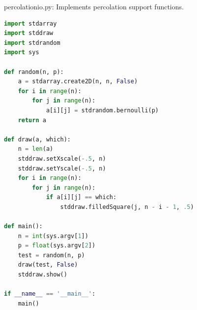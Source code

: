 \documentclass[8pt,a4paper,compress]{beamer}
\begin{document}
\begin{frame}[fragile]
\pause

\begin{framed}
\tiny percolationio.py: Implements percolation support functions.
\end{framed}

\begin{lstlisting}[language=Python,style=focusin]
import stdarray
import stddraw
import stdrandom
import sys

def random(n, p):
    a = stdarray.create2D(n, n, False)
    for i in range(n):
        for j in range(n):
            a[i][j] = stdrandom.bernoulli(p)
    return a

def draw(a, which):
    n = len(a)
    stddraw.setXscale(-.5, n)
    stddraw.setYscale(-.5, n)
    for i in range(n):
        for j in range(n):
            if a[i][j] == which:
                stddraw.filledSquare(j, n - i - 1, .5)

def main():
    n = int(sys.argv[1])
    p = float(sys.argv[2])
    test = random(n, p)
    draw(test, False)
    stddraw.show()
    
if __name__ == '__main__':
    main()
\end{lstlisting}
\end{frame}
\end{document}
